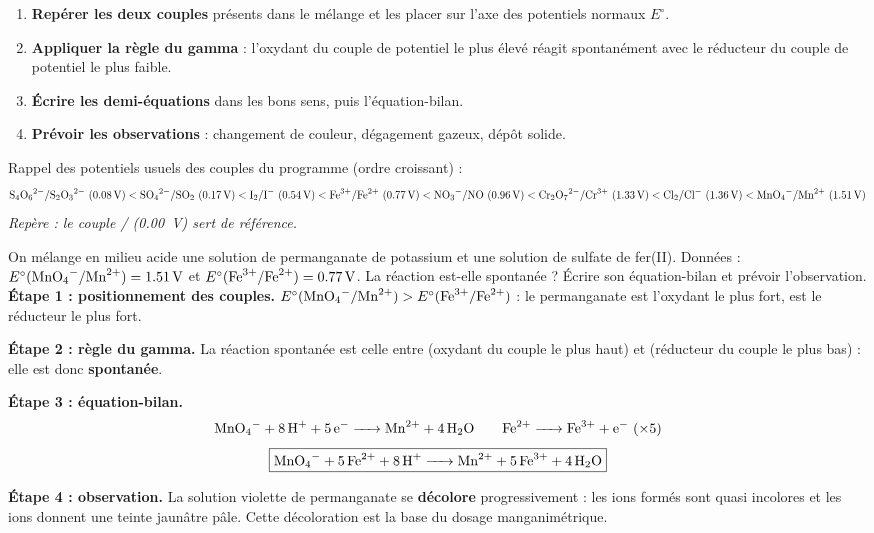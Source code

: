 \documentclass[11pt]{article}
\newcommand{\cle}[1]{{\popxbold\color{popdark}#1}}
\begin{document}
\begin{methode}
\begin{enumerate}
\item \textbf{Repérer les deux couples} présents dans le mélange et les placer sur l'axe des potentiels normaux $E^{\circ}$.
\item \textbf{Appliquer la règle du gamma} : l'oxydant du couple de potentiel le plus élevé réagit spontanément avec le réducteur du couple de potentiel le plus faible.
\item \textbf{Écrire les demi-équations} dans les bons sens, puis l'équation-bilan.
\item \textbf{Prévoir les observations} : changement de couleur, dégagement gazeux, dépôt solide.
\end{enumerate}
Rappel des potentiels usuels des couples du programme (ordre croissant) :
\[
\ce{S4O6^2-}/\ce{S2O3^2-}\ (\SI{+0,08}{V}) < \ce{SO4^2-}/\ce{SO2}\ (\SI{+0,17}{V}) < \ce{I2}/\ce{I-}\ (\SI{+0,54}{V}) < \ce{Fe^3+}/\ce{Fe^2+}\ (\SI{+0,77}{V}) < \ce{NO3-}/\ce{NO}\ (\SI{+0,96}{V}) < \ce{Cr2O7^2-}/\ce{Cr^3+}\ (\SI{+1,33}{V}) < \ce{Cl2}/\ce{Cl-}\ (\SI{+1,36}{V}) < \ce{MnO4-}/\ce{Mn^2+}\ (\SI{+1,51}{V})
\]
\emph{Repère : le couple / (\SI{0,00}{V}) sert de référence.}
\end{methode}

\begin{exoresolu}
On mélange en milieu acide une solution de permanganate de potassium et une solution de sulfate de fer(II). Données : $E^{\circ}(\ce{MnO4-}/\ce{Mn^2+})=\SI{+1,51}{V}$ et $E^{\circ}(\ce{Fe^3+}/\ce{Fe^2+})=\SI{+0,77}{V}$. La réaction est-elle spontanée ? Écrire son équation-bilan et prévoir l'observation.
\tcblower
\textbf{Étape 1 : positionnement des couples.} $E^{\circ}(\ce{MnO4-}/\ce{Mn^2+}) > E^{\circ}(\ce{Fe^3+}/\ce{Fe^2+})$ : le permanganate est l'oxydant le plus fort,  est le réducteur le plus fort.

\textbf{Étape 2 : règle du gamma.} La réaction spontanée est celle entre  (oxydant du couple le plus haut) et  (réducteur du couple le plus bas) : elle est donc \textbf{spontanée}.

\textbf{Étape 3 : équation-bilan.}
\[
\ce{MnO4- + 8H+ + 5e- -> Mn^2+ + 4H2O} \qquad \ce{Fe^2+ -> Fe^3+ + e-} \ (\times 5)
\]
\[
\boxed{\ce{MnO4- + 5Fe^2+ + 8H+ -> Mn^2+ + 5Fe^3+ + 4H2O}}
\]

\textbf{Étape 4 : observation.} La solution violette de permanganate se \textbf{décolore} progressivement : les ions  formés sont quasi incolores et les ions  donnent une teinte jaunâtre pâle. Cette décoloration est la base du \cle{dosage manganimétrique}.
\end{exoresolu}
\end{document}
